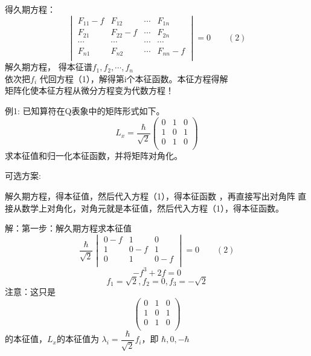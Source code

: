 \begin{frame} 
    得久期方程：
    $$\begin{vmatrix}
        F_{11}-f & F_{12} & \cdots & F_{1n} \\
        F_{21} & F_{22}-f & \cdots & F_{2n} \\
        \cdots & \cdots &  \cdots& \cdots\\
         F_{n1} & F_{n2} & \cdots & F_{nn}-f \\
     \end{vmatrix} 
     =0 \qquad (2) $$
     解久期方程， 得本征谱{$f_1,f_2,\cdots, f_n $}\\
     依次把$f_i$ 代回方程（1），解得第i个本征函数。本征方程得解\\
     矩阵化使本征方程从微分方程变为代数方程！
\end{frame}

\begin{frame} 
    \begin{tcolorbox2}{例1:}
        已知算符在Q表象中的矩阵形式如下。
        $$ L_x= \frac{\hbar}{\sqrt{2}}
        \begin{pmatrix}
            0 & 1 & 0  \\
            1 & 0 & 1  \\
            0 & 1 & 0 \\
         \end{pmatrix} $$
        求本征值和归一化本征函数，并将矩阵对角化。
    \end{tcolorbox2}
    可选方案:
    \begin{itemize}
        \done 解久期方程，得本征值，然后代入方程（1），得本征函数 ，再直接写出对角阵 
        \todo 直接从数学上对角化，对角元就是本征值，然后代入方程（1），得本征函数。
     \end{itemize}
\end{frame}

\begin{frame} 
    \alert{解：}第一步：解久期方程求本征值
    $$\frac{\hbar}{\sqrt{2}}
    \begin{vmatrix}
       0-f & 1 & 0  \\
       1 & 0-f & 1  \\
       0 & 1 & 0-f \\
    \end{vmatrix} 
    =0 \qquad (2) $$
   $$ -f^3+2f=0 $$
   $$ f_1=\sqrt{2}, f_2=0, f_3=-\sqrt{2} $$
   注意：这只是
   $$\begin{pmatrix}
       0 & 1 & 0  \\
       1 & 0 & 1  \\
       0 & 1 & 0 \\
    \end{pmatrix} $$
    的本征值，$L_x$的本征值为 $\lambda_i=\dfrac{\hbar}{\sqrt{2}} f_i$，即 $ \hbar, 0, -\hbar$
\end{frame}

